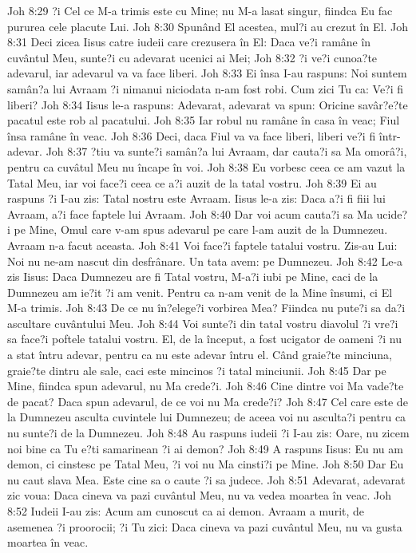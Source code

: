 Joh 8:29  ?i Cel ce M-a trimis este cu Mine; nu M-a lasat singur, fiindca Eu fac pururea cele placute Lui.
Joh 8:30  Spunând El acestea, mul?i au crezut în El.
Joh 8:31  Deci zicea Iisus catre iudeii care crezusera în El: Daca ve?i ramâne în cuvântul Meu, sunte?i cu adevarat ucenici ai Mei;
Joh 8:32  ?i ve?i cunoa?te adevarul, iar adevarul va va face liberi.
Joh 8:33  Ei însa I-au raspuns: Noi suntem samân?a lui Avraam ?i nimanui niciodata n-am fost robi. Cum zici Tu ca: Ve?i fi liberi?
Joh 8:34  Iisus le-a raspuns: Adevarat, adevarat va spun: Oricine savâr?e?te pacatul este rob al pacatului.
Joh 8:35  Iar robul nu ramâne în casa în veac; Fiul însa ramâne în veac.
Joh 8:36  Deci, daca Fiul va va face liberi, liberi ve?i fi într-adevar.
Joh 8:37  ?tiu va sunte?i samân?a lui Avraam, dar cauta?i sa Ma omorâ?i, pentru ca cuvâtul Meu nu încape în voi.
Joh 8:38  Eu vorbesc ceea ce am vazut la Tatal Meu, iar voi face?i ceea ce a?i auzit de la tatal vostru.
Joh 8:39  Ei au raspuns ?i I-au zis: Tatal nostru este Avraam. Iisus le-a zis: Daca a?i fi fiii lui Avraam, a?i face faptele lui Avraam.
Joh 8:40  Dar voi acum cauta?i sa Ma ucide?i pe Mine, Omul care v-am spus adevarul pe care l-am auzit de la Dumnezeu. Avraam n-a facut aceasta.
Joh 8:41  Voi face?i faptele tatalui vostru. Zis-au Lui: Noi nu ne-am nascut din desfrânare. Un tata avem: pe Dumnezeu.
Joh 8:42  Le-a zis Iisus: Daca Dumnezeu are fi Tatal vostru, M-a?i iubi pe Mine, caci de la Dumnezeu am ie?it ?i am venit. Pentru ca n-am venit de la Mine însumi, ci El M-a trimis.
Joh 8:43  De ce nu în?elege?i vorbirea Mea? Fiindca nu pute?i sa da?i ascultare cuvântului Meu.
Joh 8:44  Voi sunte?i din tatal vostru diavolul ?i vre?i sa face?i poftele tatalui vostru. El, de la început, a fost ucigator de oameni ?i nu a stat întru adevar, pentru ca nu este adevar întru el. Când graie?te minciuna, graie?te dintru ale sale, caci este mincinos ?i tatal minciunii.
Joh 8:45  Dar pe Mine, fiindca spun adevarul, nu Ma crede?i.
Joh 8:46  Cine dintre voi Ma vade?te de pacat? Daca spun adevarul, de ce voi nu Ma crede?i?
Joh 8:47  Cel care este de la Dumnezeu asculta cuvintele lui Dumnezeu; de aceea voi nu asculta?i pentru ca nu sunte?i de la Dumnezeu.
Joh 8:48  Au raspuns iudeii ?i I-au zis: Oare, nu zicem noi bine ca Tu e?ti samarinean ?i ai demon?
Joh 8:49  A raspuns Iisus: Eu nu am demon, ci cinstesc pe Tatal Meu, ?i voi nu Ma cinsti?i pe Mine.
Joh 8:50  Dar Eu nu caut slava Mea. Este cine sa o caute ?i sa judece.
Joh 8:51  Adevarat, adevarat zic voua: Daca cineva va pazi cuvântul Meu, nu va vedea moartea în veac.
Joh 8:52  Iudeii I-au zis: Acum am cunoscut ca ai demon. Avraam a murit, de asemenea ?i proorocii; ?i Tu zici: Daca cineva va pazi cuvântul Meu, nu va gusta moartea în veac.
